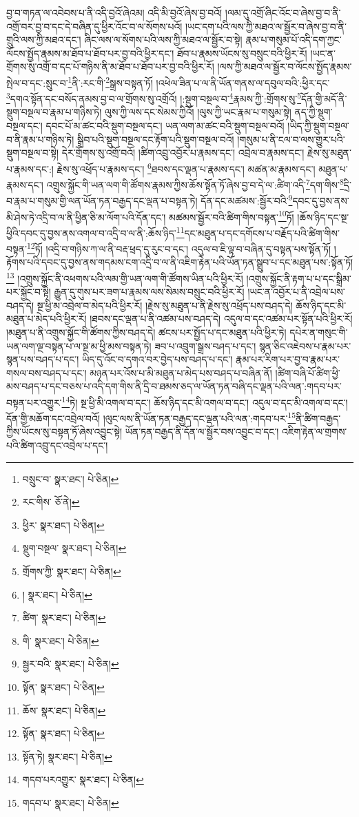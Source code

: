 བྱ་བ་གཏན་ལ་འབེབས་པ་ནི་འདི་བྱའོ་ཞེའམ། འདི་མི་བྱའོ་ཞེས་བྱ་བའོ། །ལམ་དུ་འགྲོ་ཞིང་འོང་བ་ཞེས་བྱ་བ་ནི་འགྲོ་བར་བྱ་བ་དང་དེ་བཞིན་དུ་ཕྱིར་འོང་བ་ལ་སོགས་པའོ། །ཡང་དག་པའི་ལས་ཀྱི་མཐའ་ལ་སྦྱོར་བ་ཞེས་བྱ་བ་ནི་གྲུའི་ལས་ཀྱི་མཐའ་དང་། ཞིང་ལས་ལ་སོགས་པའི་ལས་ཀྱི་མཐའ་ལ་སྦྱོར་བ་སྟེ། རྣམ་པ་གསུམ་པོ་འདི་དག་ཀྱང་ལོངས་སྤྱོད་རྣམས་མ་ཐོབ་པ་ཐོབ་པར་བྱ་བའི་ཕྱིར་དང་། ཐོབ་པ་རྣམས་ཡོངས་སུ་བསྲུང་བའི་ཕྱིར་རོ། །ཡང་ན་གྲོགས་སུ་འགྲོ་བ་དང་པོ་གཉིས་ནི་མ་ཐོབ་པ་ཐོབ་པར་བྱ་བའི་ཕྱིར་རོ། །ལས་ཀྱི་མཐའ་ལ་སྦྱོར་བ་ལོངས་སྤྱོད་རྣམས་སྤེལ་བ་དང་:སྲུང་བ་\footnote{བསྲུང་བ་  སྣར་ཐང་།  པེ་ཅིན། }ནི་:རང་གི་\footnote{རང་གིས་  ཅོ་ནེ། }སྒྲས་བསྟན་ཏོ། །འཕེལ་ཟིན་པ་ལ་ནི་ཡོན་གནས་ལ་དབུལ་བའི་:ཕྱིར་དང་\footnote{ཕྱིར་  སྣར་ཐང་།  པེ་ཅིན། }དགའ་སྟོན་དང་བསོད་ནམས་བྱ་བ་ལ་གྲོགས་སུ་འགྲོའོ། །:སྡུག་བསྔལ་བ་\footnote{སྡུག་བསྔལ་  སྣར་ཐང་།  པེ་ཅིན། }རྣམས་ཀྱི་:གྲོགས་སུ་\footnote{གྲོགས་ཀྱི་  སྣར་ཐང་།  པེ་ཅིན། }དོན་གྱི་མདོ་ནི་སྡུག་བསྔལ་བ་རྣམ་པ་གཉིས་ཏེ། ལུས་ཀྱི་ལས་དང་སེམས་ཀྱིའོ། །ལུས་ཀྱི་ཡང་རྣམ་པ་གསུམ་སྟེ། ནད་ཀྱི་སྡུག་བསྔལ་དང་། དབང་པོ་མ་ཚང་བའི་སྡུག་བསྔལ་དང་། ཡན་ལག་མ་ཚང་བའི་སྡུག་བསྔལ་བའོ། །ཡིད་ཀྱི་སྡུག་བསྔལ་བ་ནི་རྣམ་པ་གཉིས་ཏེ། སྒྲིབ་པའི་སྡུག་བསྔལ་དང་རྟོག་པའི་སྡུག་བསྔལ་བའོ། །གསུམ་པ་ནི་ངལ་བ་ལས་གྱུར་པའི་སྡུག་བསྔལ་བ་སྟེ། དེར་གྲོགས་སུ་འགྲོ་བའོ། །ཚིག་འབྲུ་འབྱོར་པ་རྣམས་དང་། འབྲེལ་བ་རྣམས་དང་། རྗེས་སུ་མཐུན་པ་རྣམས་དང་:། རྗེས་སུ་འཕྲོད་པ་རྣམས་དང་། \footnote{།    སྣར་ཐང་།  པེ་ཅིན། }ཐབས་དང་ལྡན་པ་རྣམས་དང་། མཚན་མ་རྣམས་དང་། མཐུན་པ་རྣམས་དང་། འགྲུས་སྐྱོང་གི་ཡན་ལག་གི་ཚོགས་རྣམས་ཀྱིས་ཆོས་སྟོན་ཏོ་ཞེས་བྱ་བ་དེ་ལ་:ཚིག་འདི་\footnote{ཚིག་  སྣར་ཐང་།  པེ་ཅིན། }དག་གིས་\footnote{གི་  སྣར་ཐང་།  པེ་ཅིན། }དྲི་བ་རྣམ་པ་གསུམ་གྱི་ལན་ཡོན་ཏན་བརྒྱད་དང་ལྡན་པ་བསྟན་ཏེ། དོན་དང་མཚམས་:སྦྱོར་བའི་\footnote{སྦྱར་བའི་  སྣར་ཐང་།  པེ་ཅིན། }དབང་དུ་བྱས་ནས་མི་ཤེས་ཏེ་འདྲི་བ་ལ་ནི་ཕྱིན་ཅི་མ་ལོག་པའི་དོན་དང་། མཚམས་སྦྱོར་བའི་ཚིག་གིས་བསྟན་\footnote{སྟོན་  སྣར་ཐང་།  པེ་ཅིན། }ཏོ། །ཆོས་ཉིད་དང་སྔ་ཕྱིའི་དབང་དུ་བྱས་ནས་འགལ་བ་འདྲི་བ་ལ་ནི་:ཆོས་ཉིད་\footnote{ཆོས་  སྣར་ཐང་།  པེ་ཅིན། }དང་མཐུན་པ་དང་དགོངས་པ་བརྗོད་པའི་ཚིག་གིས་བསྟན་\footnote{སྟོན་  སྣར་ཐང་།  པེ་ཅིན། }ཏོ། །འདྲི་བ་གཉིས་ཀ་ལ་ནི་བརྡ་ཕྲད་དུ་རུང་བ་དང་། འདུལ་བ་ཇི་ལྟ་བ་བཞིན་དུ་བསྟན་པས་སྟོན་ཏོ། །རྟོགས་པའི་དབང་དུ་བྱས་ནས་གདམས་ངག་འདྲི་བ་ལ་ནི་འཇིག་རྟེན་པའི་ཡོན་ཏན་སྒྲུབ་པ་དང་མཐུན་པས་:སྟོན་ཏོ།\footnote{སྟོན་ཏེ།  སྣར་ཐང་།  པེ་ཅིན། } །འགྲུས་སྐྱོང་ནི་འཕགས་པའི་ལམ་གྱི་ཡན་ལག་གི་ཚོགས་ཡིན་པའི་ཕྱིར་རོ། །འགྲུས་སྐྱོང་ནི་རྟག་པ་པ་དང་སྒྲིམ་པར་སྐྱོང་བ་སྟེ། རྒྱུན་དུ་གུས་པར་ཟག་པ་རྣམས་ལས་སེམས་བསྲུང་བའི་ཕྱིར་རོ། །ཡང་ན་འབྱོར་པ་ནི་འབྲེལ་པས་བཤད་དེ། སྔ་ཕྱི་མ་འབྲེལ་བ་མེད་པའི་ཕྱིར་རོ། །རྗེས་སུ་མཐུན་པ་ནི་རྗེས་སུ་འཕྲོད་པས་བཤད་དེ། ཆོས་ཉིད་དང་མི་མཐུན་པ་མེད་པའི་ཕྱིར་རོ། །ཐབས་དང་ལྡན་པ་ནི་འཚམ་པས་བཤད་དེ། འདུལ་བ་དང་འཚམ་པར་སྟོན་པའི་ཕྱིར་རོ། །མཐུན་པ་ནི་འགྲུས་སྐྱོང་གི་ཚོགས་ཀྱིས་བཤད་དེ། ཚངས་པར་སྤྱོད་པ་དང་མཐུན་པའི་ཕྱིར་ཏེ། དཔེར་ན་གསུང་གི་ཡན་ལག་ལྔ་བསྟན་པ་ལ་སྔ་མ་ཕྱི་མས་བསྟན་ཏེ། ཟབ་པ་འབྲུག་སྒྲས་བཤད་པ་དང་། སྙན་ཅིང་འཇེབས་པ་རྣམ་པར་སྙན་པས་བཤད་པ་དང་། ཡིད་དུ་འོང་བ་དགའ་བར་བྱེད་པས་བཤད་པ་དང་། རྣམ་པར་རིག་པར་བྱ་བ་རྣམ་པར་གསལ་བས་བཤད་པ་དང་། མཉན་པར་འོས་པ་མི་མཐུན་པ་མེད་པས་བཤད་པ་བཞིན་ནོ། །ཚིག་བཞི་པོ་ཚིག་ཕྱི་མས་བཤད་པ་དང་བཅས་པ་འདི་དག་གིས་ནི་དྲི་བ་ཐམས་ཅད་ལ་ཡོན་ཏན་བཞི་དང་ལྡན་པའི་ལན་:གདབ་པར་བསྟན་པར་འགྱུར་\footnote{གདབ་པརའགྱུར་  སྣར་ཐང་།  པེ་ཅིན། }ཏེ། སྔ་ཕྱི་མི་འགལ་བ་དང་། ཆོས་ཉིད་དང་མི་འགལ་བ་དང་། འདུལ་བ་དང་མི་འགལ་བ་དང་། དོན་གྱི་མཆོག་དང་འབྲེལ་བའོ། །ལུང་ལས་ནི་ཡོན་ཏན་བརྒྱད་དང་ལྡན་པའི་ལན་:གདབ་པར་\footnote{གདབ་པ་  སྣར་ཐང་།  པེ་ཅིན། }ནི་ཚིག་བརྒྱད་ཀྱིས་ཡོངས་སུ་བསྟན་ཏོ་ཞེས་འབྱུང་སྟེ། ཡོན་ཏན་བརྒྱད་ནི་དོན་ལ་སྦྱོར་བས་འབྱུང་བ་དང་། འཇིག་རྟེན་ལ་གྲགས་པའི་ཚིག་འབྲུ་དང་འབྲེལ་པ་དང་། 